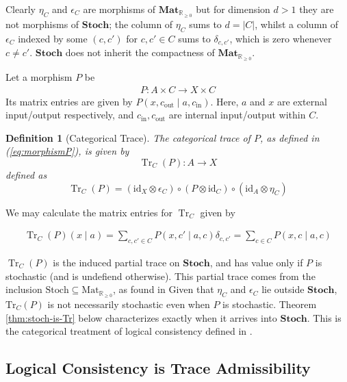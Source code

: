 \documentclass[10pt, a4paper]{article}
\newcommand{\Tr}[0]{\operatorname{Tr}}
\newcommand{\id}[0]{\mathrm{id}}
\newtheorem{definition}{Definition}
\begin{document}
Clearly $\eta_C$ and $\epsilon_C$ are morphisms of $\mathbf{Mat}_{\mathbb{R}_{\geq 0}}$
but for dimension $d > 1$ they are not morphisms of $\mathbf{Stoch}$; the column of $\eta_C$ sums to $d = |C|$, whilst a column of $\epsilon_C$ indexed by some $(c, c')$ for $c, c' \in C$ sums to $\delta_{c, c'}$, which is zero whenever $c \neq c'$. $\mathbf{Stoch}$ does not inherit the compactness of $\mathbf{Mat}_{\mathbb{R}_{\geq 0}}$.

Let a morphism $P$ be 
\begin{align}\label{eq:morphismP}
    P: A \times C \rightarrow X \times C
\end{align}
Its matrix entries are given by $P(x, c_{\mathrm{out}} \mid a, c_{\mathrm{in}})$. Here, $a$ and $x$ are external input/output respectively, and $c_{\mathrm{in}}, c_{\mathrm{out}}$ are internal input/output within $C$.

\begin{definition}[Categorical Trace]\label{def:catTrace}
The categorical trace of $P$, as defined in (\ref{eq:morphismP}), is given by $$ \Tr_C(P) : A \rightarrow X $$ defined as $$ \Tr_C(P) = (\id_X \otimes \epsilon_C) \circ (P \otimes \id_C) \circ (\id_A \otimes \eta_C) $$ \end{definition}

We may calculate the matrix entries for $\Tr_C$ given by 

\begin{align} 
    \Tr_C(P)(x \mid a ) = \sum_{c, c' \in C} P(x, c' \mid a, c)\delta_{c,c'} = \sum_{c \in C} P(x, c \mid a, c)
\end{align}

$\Tr_C(P)$ is the induced partial trace on $\mathbf{Stoch}$, and has value only if $P$ is stochastic (and is undefiend otherwise). This partial trace comes from the inclusion $\mathrm{Stoch} \subseteq \mathrm{Mat}_{\mathbb R_{\ge0}}$, as found in \cite[Prop. 3.20]{Malherbe2012} Given that $\eta_C$ and $\epsilon_C$ lie outside $\mathbf{Stoch}$, $\mathrm{Tr}_C(P)$ is not necessarily stochastic even when $P$ is stochastic. Theorem \ref{thm:stoch-is-Tr} below characterizes exactly when it arrives into $\mathbf{Stoch}$. This is the categorical treatment of logical consistency defined in \cite{BaumelerWolf2017}.

\subsection{Logical Consistency is Trace Admissibility}
\end{document}
